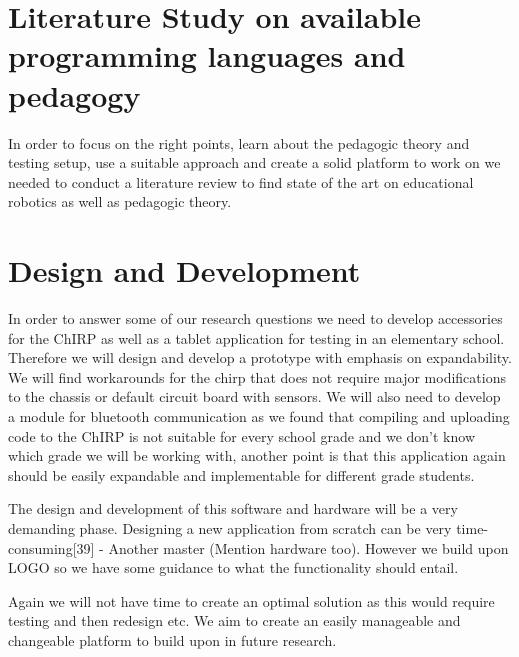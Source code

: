 \section{Literature Study on available programming languages and pedagogy}
In order to focus on the right points, learn about the pedagogic theory and testing setup, use a suitable approach and create a solid platform to work on we needed to conduct a literature review to find state of the art on educational robotics as well as pedagogic theory. 


\section{Design and Development}
In order to answer some of our research questions we need to develop accessories for the ChIRP as well as a tablet application for testing in an elementary school. Therefore we will design and develop a prototype with emphasis on expandability. We will find workarounds for the chirp that does not require major modifications to the chassis or default circuit board with sensors. We will also need to develop a module for bluetooth communication as we found that compiling and uploading code to the ChIRP is not suitable for every school grade and we don't know which grade we will be working with, another point is that this application again should be easily expandable and implementable for different grade students.  

The design and development of this software and hardware will be a very demanding phase. Designing a new application from scratch can be very time-consuming[39] - Another master (Mention hardware too). However we build upon LOGO so we have some guidance to what the functionality should entail. 

Again we will not have time to create an optimal solution as this would require testing and then redesign etc. We aim to create an easily manageable and changeable platform to build upon in future research. 

